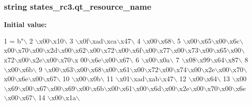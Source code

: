 \subsubsection[{qt\+\_\+resource\+\_\+name}]{\setlength{\rightskip}{0pt plus 5cm}string states\+\_\+rc3.\+qt\+\_\+resource\+\_\+name}\label{namespacestates__rc3_ad79cdff1cdefefe2ee100004fa285b7c}
{\bfseries Initial value\+:}
\begin{DoxyCode}
1 = b\textcolor{stringliteral}{"\(\backslash\)}
2 \textcolor{stringliteral}{\(\backslash\)x00\(\backslash\)x10\(\backslash\)}
3 \textcolor{stringliteral}{\(\backslash\)x0f\(\backslash\)xad\(\backslash\)xca\(\backslash\)x47\(\backslash\)}
4 \textcolor{stringliteral}{\(\backslash\)x00\(\backslash\)x68\(\backslash\)}
5 \textcolor{stringliteral}{\(\backslash\)x00\(\backslash\)x65\(\backslash\)x00\(\backslash\)x6c\(\backslash\)x00\(\backslash\)x70\(\backslash\)x00\(\backslash\)x2d\(\backslash\)x00\(\backslash\)x62\(\backslash\)x00\(\backslash\)x72\(\backslash\)x00\(\backslash\)x6f\(\backslash\)x00\(\backslash\)x77\(\backslash\)x00\(\backslash\)x73\(\backslash\)x00\(\backslash\)x65\(\backslash\)x00\(\backslash\)x72\(\backslash\)x00\(\backslash\)x2e\(\backslash\)x00\(\backslash\)x70\(\backslash\)x
      00\(\backslash\)x6e\(\backslash\)x00\(\backslash\)x67\(\backslash\)}
6 \textcolor{stringliteral}{\(\backslash\)x00\(\backslash\)x0a\(\backslash\)}
7 \textcolor{stringliteral}{\(\backslash\)x08\(\backslash\)x99\(\backslash\)x64\(\backslash\)x87\(\backslash\)}
8 \textcolor{stringliteral}{\(\backslash\)x00\(\backslash\)x6b\(\backslash\)}
9 \textcolor{stringliteral}{\(\backslash\)x00\(\backslash\)x63\(\backslash\)x00\(\backslash\)x68\(\backslash\)x00\(\backslash\)x61\(\backslash\)x00\(\backslash\)x72\(\backslash\)x00\(\backslash\)x74\(\backslash\)x00\(\backslash\)x2e\(\backslash\)x00\(\backslash\)x70\(\backslash\)x00\(\backslash\)x6e\(\backslash\)x00\(\backslash\)x67\(\backslash\)}
10 \textcolor{stringliteral}{\(\backslash\)x00\(\backslash\)x0b\(\backslash\)}
11 \textcolor{stringliteral}{\(\backslash\)x01\(\backslash\)xad\(\backslash\)xab\(\backslash\)x47\(\backslash\)}
12 \textcolor{stringliteral}{\(\backslash\)x00\(\backslash\)x64\(\backslash\)}
13 \textcolor{stringliteral}{\(\backslash\)x00\(\backslash\)x69\(\backslash\)x00\(\backslash\)x67\(\backslash\)x00\(\backslash\)x69\(\backslash\)x00\(\backslash\)x6b\(\backslash\)x00\(\backslash\)x61\(\backslash\)x00\(\backslash\)x6d\(\backslash\)x00\(\backslash\)x2e\(\backslash\)x00\(\backslash\)x70\(\backslash\)x00\(\backslash\)x6e\(\backslash\)x00\(\backslash\)x67\(\backslash\)}
14 \textcolor{stringliteral}{\(\backslash\)x00\(\backslash\)x1a\(\backslash\)}

\end{DoxyCode}
